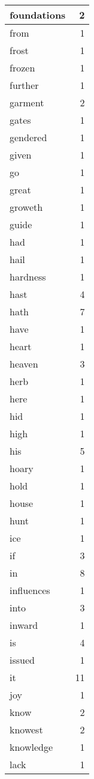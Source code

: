 \begin{center}
\begin{longtable}{l|r}
foundations & 2 \\ \hline
from & 1 \\ \hline
frost & 1 \\ \hline
frozen & 1 \\ \hline
further & 1 \\ \hline
garment & 2 \\ \hline
gates & 1 \\ \hline
gendered & 1 \\ \hline
given & 1 \\ \hline
go & 1 \\ \hline
great & 1 \\ \hline
groweth & 1 \\ \hline
guide & 1 \\ \hline
had & 1 \\ \hline
hail & 1 \\ \hline
hardness & 1 \\ \hline
hast & 4 \\ \hline
hath & 7 \\ \hline
have & 1 \\ \hline
heart & 1 \\ \hline
heaven & 3 \\ \hline
herb & 1 \\ \hline
here & 1 \\ \hline
hid & 1 \\ \hline
high & 1 \\ \hline
his & 5 \\ \hline
hoary & 1 \\ \hline
hold & 1 \\ \hline
house & 1 \\ \hline
hunt & 1 \\ \hline
ice & 1 \\ \hline
if & 3 \\ \hline
in & 8 \\ \hline
influences & 1 \\ \hline
into & 3 \\ \hline
inward & 1 \\ \hline
is & 4 \\ \hline
issued & 1 \\ \hline
it & 11 \\ \hline
joy & 1 \\ \hline
know & 2 \\ \hline
knowest & 2 \\ \hline
knowledge & 1 \\ \hline
lack & 1 \\ \hline

\end{longtable}
\end{center}
